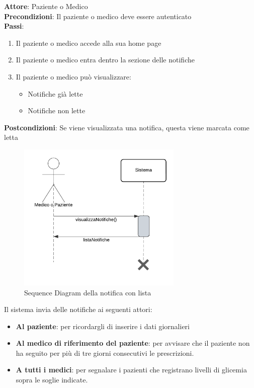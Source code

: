 \documentclass[a4paper]{article}
\begin{document}
\begin{mdframed}
  \textbf{Attore}: Paziente o Medico\\
  \textbf{Precondizioni}: Il paziente o medico deve essere autenticato\\
  \textbf{Passi}: 
  \begin{enumerate}[nosep]
    \item Il paziente o medico accede alla sua home page
    \item Il paziente o medico entra dentro la sezione delle notifiche
    \item  Il paziente o medico può visualizzare:
      \begin{itemize}
        \item  Notifiche già lette
        \item  Notifiche non lette
      \end{itemize}
  \end{enumerate}
  \textbf{Postcondizioni}: Se viene visualizzata una notifica, questa viene marcata come letta
\end{mdframed}


\begin{figure}[H]
  \centering
  \includegraphics[width=0.7\textwidth]{sdNotifList.pdf}
  \caption{Sequence Diagram della notifica con lista}
  \label{fig:sdNotifList}
\end{figure}
\noindent
Il sistema invia delle notifiche ai seguenti attori:
\begin{itemize}
  \item \textbf{Al paziente}: per ricordargli di inserire i dati giornalieri
  \item \textbf{Al medico di riferimento del paziente}: per avvisare che il paziente  
    non ha seguito per più di tre giorni consecutivi le prescrizioni.
  \item \textbf{A tutti i medici}: per segnalare i pazienti che registrano
    livelli di glicemia sopra le soglie indicate.
\end{itemize}
\end{document}
